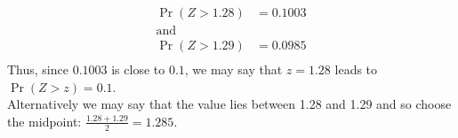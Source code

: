 \documentclass[12pt]{article}
\begin{document}
{\begin{minipage}[t]{0.98\textwidth}
\begin{minipage}[t]{0.47\textwidth}
\begin{enumerate}[a)]
\begin{align*}
\Pr(Z > 1.28) &= 0.1003\\
\text{and}&\\
\Pr(Z > 1.29) &= 0.0985\\
\end{align*}
Thus, since $0.1003$ is close to $0.1$, we may say that $z = 1.28$ leads to $\Pr(Z > z) = 0.1$.\\[0.4cm]
Alternatively we may say that the value lies between 1.28 and 1.29 and so choose the midpoint: $\frac{1.28+1.29}{2} = 1.285$.
\end{enumerate}
\end{minipage}
\end{minipage}}\vspace{0.03\textwidth}


\end{document}
